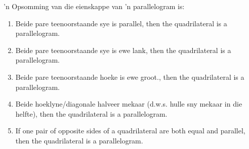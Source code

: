 ’n Opsomming van die eienskappe van ’n parallelogram is:
\begin{enumerate}[label=\textbf{\arabic*}.]
 \item Beide pare teenoorstaande sye is parallel, then the quadrilateral is a parallelogram.
 \item Beide pare teenoorstaande sye is ewe lank, then the quadrilateral is a parallelogram.
 \item Beide pare teenoorstaande hoeke is ewe groot., then the quadrilateral is a parallelogram.
 \item Beide hoeklyne/diagonale halveer mekaar (d.w.s. hulle sny mekaar in die helfte), then the quadrilateral is a parallelogram.
 \item If one pair of opposite sides of a quadrilateral are both equal and parallel, then the quadrilateral is a parallelogram.
\end{enumerate}

